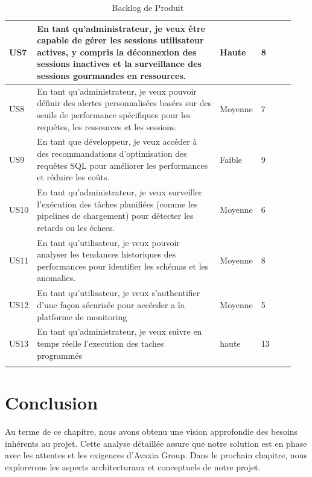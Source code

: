 \begin{center}
\begin{longtable}{|p{0.05\linewidth}|p{0.65\linewidth}|p{0.12\linewidth}|p{0.12\linewidth}|}
        \hline
        
        US7 &  En tant qu'administrateur, je veux être capable de gérer les sessions utilisateur actives, y compris la déconnexion des sessions inactives et la surveillance des sessions gourmandes en ressources. & Haute & 8 \\
        
        \hline
        
        US8 &  En tant qu'administrateur, je veux pouvoir définir des alertes personnalisées basées sur des seuils de performance spécifiques pour les requêtes, les ressources et les sessions. & Moyenne & 7 \\
        
        \hline
        
        US9 &  En tant que développeur, je veux accéder à des recommandations d'optimisation des requêtes SQL pour améliorer les performances et réduire les coûts. & Faible & 9 \\
        
        \hline
        
        US10& En tant qu'administrateur, je veux surveiller l'exécution des tâches planifiées (comme les pipelines de chargement) pour détecter les retards ou les échecs. & Moyenne & 6 \\
        
        \hline
        
        US11 & En tant qu'utilisateur, je veux pouvoir analyser les tendances historiques des performances pour identifier les schémas et les anomalies. & Moyenne & 8 \\
        
        \hline
        
        US12 & En tant qu'utilisateur, je veux s'authentifier d'une façon sécurisée pour accéeder a la platforme de monitoring & Moyenne & 5 \\
        
        \hline
        US13 & En tant qu'administrateur, je veux suivre en temps réelle l'execution des taches programmés  & haute & 13 \\
        
        \hline
        
        \caption{Backlog de Produit}
        \label{tab:backlog_produit}
    \end{longtable}

\end{center}


\vspace{-1cm}
\section*{Conclusion}
 Au terme de ce chapitre, nous avons obtenu une vision approfondie des besoins inhérents au projet. Cette analyse détaillée assure que notre solution est en phase avec les attentes et les exigences d'Avaxia Group. Dans le prochain chapitre, nous explorerons les aspects architecturaux et conceptuels de notre projet.